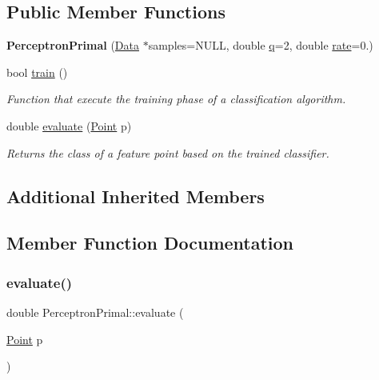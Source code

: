 \subsection*{Public Member Functions}
\begin{DoxyCompactItemize}
\item 
\mbox{\label{class_perceptron_primal_a39efaee2fbf8d0ad6b9955e46cfd91b3}} 
{\bfseries Perceptron\+Primal} (\hyperlink{class_data}{Data} $\ast$samples=N\+U\+LL, double \hyperlink{class_primal_classifier_a746ad2ff93fb77d82ae389f90dbdc89e}{q}=2, double \hyperlink{class_classifier_af9867e5919742de1303dd971a9a1c19a}{rate}=0.)
\item 
bool \hyperlink{class_perceptron_primal_a17f817a72fc7d61d1686ea77f7f9e84d}{train} ()
\begin{DoxyCompactList}\small\item\em Function that execute the training phase of a classification algorithm. \end{DoxyCompactList}\item 
double \hyperlink{class_perceptron_primal_ac8ce9ceffe2b35b5386e5367fb419b3b}{evaluate} (\hyperlink{class_point}{Point} p)
\begin{DoxyCompactList}\small\item\em Returns the class of a feature point based on the trained classifier. \end{DoxyCompactList}\end{DoxyCompactItemize}
\subsection*{Additional Inherited Members}


\subsection{Member Function Documentation}
\mbox{\label{class_perceptron_primal_ac8ce9ceffe2b35b5386e5367fb419b3b}} 
\subsubsection{\texorpdfstring{evaluate()}{evaluate()}}
{\footnotesize\ttfamily double Perceptron\+Primal\+::evaluate (\begin{DoxyParamCaption}\item[{\hyperlink{class_point}{Point}}]{p }\end{DoxyParamCaption})\hspace{0.3cm}{\ttfamily [virtual]}}



